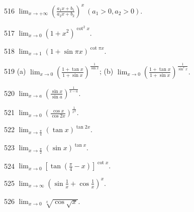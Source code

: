 \begin{prob}[S]{516}
$\displaystyle \lim_{x\to +\infty} \left(\frac{a_1 x + b_1}{a_2 x + b_2}\right)^x \ (a_1 > 0, a_2 > 0).$
\end{prob}

\begin{prob}[S]{517}
$\displaystyle \lim_{x\to 0} (1+x^2)^{\cot^2 x}.$
\end{prob}

\begin{prob}[S]{518}
$\displaystyle \lim_{x\to 1} (1+\sin\pi x)^{\cot\pi x}.$
\end{prob}

\begin{prob}[M]{519}
(a) $\displaystyle \lim_{x\to 0} \left(\frac{1+\tan x}{1+\sin x}\right)^{\frac{1}{\sin x}}$; \qquad (b) $\displaystyle \lim_{x\to 0} \left(\frac{1+\tan x}{1+\sin x}\right)^{\frac{1}{\sin^3 x}}.$
\end{prob}

\begin{prob}[S]{520}
$\displaystyle \lim_{x\to a} \left(\frac{\sin x}{\sin a}\right)^{\frac{1}{x-a}}.$
\end{prob}

\begin{prob}[S]{521}
$\displaystyle \lim_{x\to 0} \left(\frac{\cos x}{\cos 2x}\right)^{\frac{1}{x^2}}.$
\end{prob}

\begin{prob}[S]{522}
$\displaystyle \lim_{x\to \frac{\pi}{4}} (\tan x)^{\tan 2x}.$
\end{prob}

\begin{prob}[S]{523}
$\displaystyle \lim_{x\to \frac{\pi}{2}} (\sin x)^{\tan x}.$
\end{prob}

\begin{prob}[S]{524}
$\displaystyle \lim_{x\to 0} \left[\tan\left(\frac{\pi}{4}-x\right)\right]^{\cot x}.$
\end{prob}

\begin{prob}[S]{525}
$\displaystyle \lim_{x\to \infty} \left(\sin\frac{1}{x} + \cos\frac{1}{x}\right)^x.$
\end{prob}

\begin{prob}[S]{526}
$\displaystyle \lim_{x\to 0} \sqrt[x]{\cos\sqrt{x}}.$
\end{prob}


